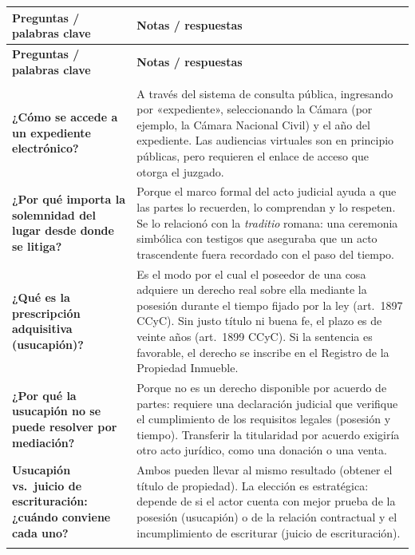 \documentclass[12pt,oneside]{book}
\begin{document}
\begin{longtable}{
    >{\raggedright\arraybackslash}p{}
    >{\raggedright\arraybackslash}p{}
}
\toprule
\textbf{Preguntas / palabras clave} & \textbf{Notas / respuestas} \\
\midrule
\endfirsthead

\toprule
\textbf{Preguntas / palabras clave} & \textbf{Notas / respuestas} \\
\midrule
\endhead

\midrule
\multicolumn{2}{r}{\textit{Continúa en la página siguiente}} \\
\endfoot

\bottomrule
\endlastfoot

\textbf{¿Cómo se accede a un expediente electrónico?} &
A través del sistema de consulta pública, ingresando por «expediente», seleccionando la Cámara (por ejemplo, la Cámara Nacional Civil) y el año del expediente. Las audiencias virtuales son en principio públicas, pero requieren el enlace de acceso que otorga el juzgado. \\
\addlinespace

\textbf{¿Por qué importa la solemnidad del lugar desde donde se litiga?} &
Porque el marco formal del acto judicial ayuda a que las partes lo recuerden, lo comprendan y lo respeten. Se lo relacionó con la \textit{traditio} romana: una ceremonia simbólica con testigos que aseguraba que un acto trascendente fuera recordado con el paso del tiempo. \\
\addlinespace

\textbf{¿Qué es la prescripción adquisitiva (usucapión)?} &
Es el modo por el cual el poseedor de una cosa adquiere un derecho real sobre ella mediante la posesión durante el tiempo fijado por la ley (art.\ 1897 CCyC). Sin justo título ni buena fe, el plazo es de veinte años (art.\ 1899 CCyC). Si la sentencia es favorable, el derecho se inscribe en el Registro de la Propiedad Inmueble. \\
\addlinespace

\textbf{¿Por qué la usucapión no se puede resolver por mediación?} &
Porque no es un derecho disponible por acuerdo de partes: requiere una declaración judicial que verifique el cumplimiento de los requisitos legales (posesión y tiempo). Transferir la titularidad por acuerdo exigiría otro acto jurídico, como una donación o una venta. \\
\addlinespace

\textbf{Usucapión vs.\ juicio de escrituración: ¿cuándo conviene cada uno?} &
Ambos pueden llevar al mismo resultado (obtener el título de propiedad). La elección es estratégica: depende de si el actor cuenta con mejor prueba de la posesión (usucapión) o de la relación contractual y el incumplimiento de escriturar (juicio de escrituración). \\
\addlinespace


\end{longtable}
\end{document}
